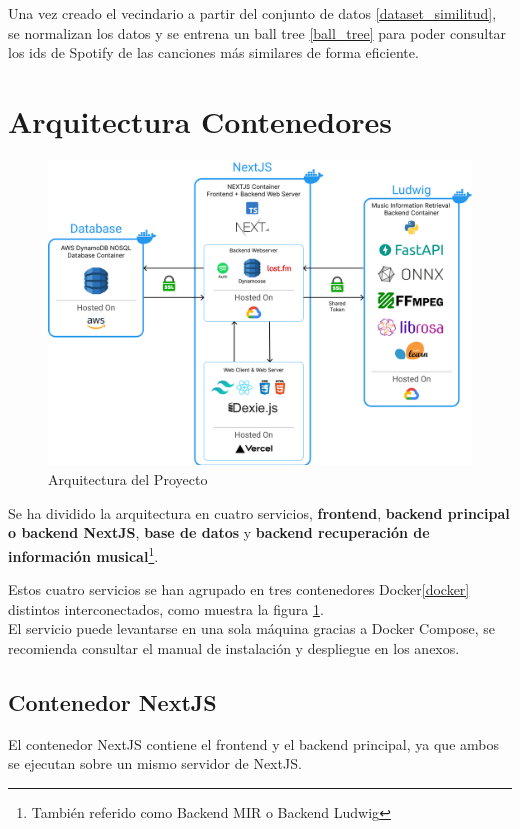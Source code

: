 Una vez creado el vecindario a partir del conjunto de datos \ref{dataset_similitud}, se normalizan los datos y se entrena un ball tree \ref{ball_tree} para poder consultar los ids de Spotify de las canciones más similares de forma eficiente.



\section{Arquitectura Contenedores}

\begin{figure}
    \centering
    \includegraphics[width=\textwidth]{img/5/arch.png}
    \caption{Arquitectura del Proyecto}
    \label{fig:arquitectura_contenedores}
\end{figure}

Se ha dividido la arquitectura en cuatro servicios, \textbf{frontend}, \textbf{backend principal o backend NextJS}, \textbf{base de datos} y \textbf{backend recuperación de información musical}\footnote{También referido como Backend MIR o Backend Ludwig}. 

Estos cuatro servicios se han agrupado en tres contenedores Docker\ref{docker} distintos interconectados, como muestra la figura \ref{fig:arquitectura_contenedores}.\\
El servicio puede levantarse en una sola máquina gracias a Docker Compose, se recomienda consultar el manual de instalación y despliegue en los anexos. 

\subsection{Contenedor NextJS}
El contenedor NextJS contiene el frontend y el backend principal, ya que ambos se ejecutan sobre un mismo servidor de NextJS. 

